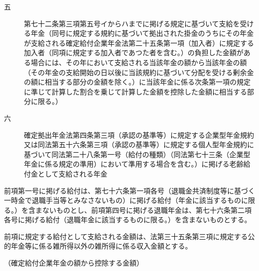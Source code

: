 \documentclass[twocolumn,a4j,10pt]{ltjtarticle}
\begin{document}
\begin{description}
\begin{description}
\item[五]第七十二条第三項第五号イからハまでに掲げる規定に基づいて支給を受ける年金（同号に規定する規約に基づいて拠出された掛金のうちにその年金が支給される確定給付企業年金法第二十五条第一項（加入者）に規定する加入者（同項に規定する加入者であつた者を含む。）の負担した金額がある場合には、その年において支給される当該年金の額から当該年金の額（その年金の支給開始の日以後に当該規約に基づいて分配を受ける剰余金の額に相当する部分の金額を除く。）に当該年金に係る次条第一項の規定に準じて計算した割合を乗じて計算した金額を控除した金額に相当する部分に限る。）
\item[六]確定拠出年金法第四条第三項（承認の基準等）に規定する企業型年金規約又は同法第五十六条第三項（承認の基準等）に規定する個人型年金規約に基づいて同法第二十八条第一号（給付の種類）（同法第七十三条（企業型年金に係る規定の準用）において準用する場合を含む。）に掲げる老齢給付金として支給される年金
\end{description}
\item[\rensuji{3}]前項第一号に掲げる給付は、第七十六条第一項各号（退職金共済制度等に基づく一時金で退職手当等とみなさないもの）に掲げる給付（年金に該当するものに限る。）を含まないものとし、前項第四号に掲げる退職年金は、第七十六条第二項各号に掲げる給付（退職年金に該当するものに限る。）を含まないものとする。
\item[\rensuji{4}]前項に規定する給付として支給される金額は、法第三十五条第三項に規定する公的年金等に係る雑所得以外の雑所得に係る収入金額とする。
\end{description}
\noindent\hspace{10pt}（確定給付企業年金の額から控除する金額）
\end{document}
